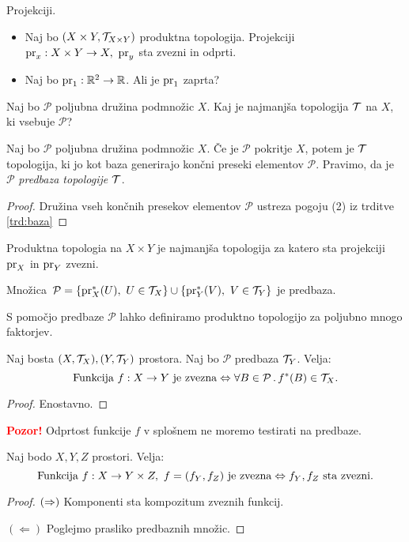 \begin{zgled} 
    Projekciji.
    \begin{itemize}
        \item Naj bo $(X \times Y, \mathcal{T}_{X \times Y})$ produktna topologija. Projekciji $\operatorname{pr}_x: X \times Y \to X, \ \operatorname{pr}_y$ sta zvezni in odprti.
        \item Naj bo $\operatorname{pr}_1: \mathbb{R}^2 \to \mathbb{R}$. Ali je $\operatorname{pr}_1$ zaprta?
    \end{itemize} 
\end{zgled}

Naj bo $\mathcal{P}$ poljubna družina podmnožic $X$. Kaj je najmanjša topologija $\mathcal{T}$ na $X$, ki vsebuje $\mathcal{P}$?

\begin{trditev}
    Naj bo $\mathcal{P}$ poljubna družina podmnožic $X$. Če je $\mathcal{P}$ pokritje $X$, potem je $\mathcal{T}$ topologija, ki jo kot baza generirajo končni preseki elementov $\mathcal{P}$.
    Pravimo, da je $\mathcal{P}$ \emph{predbaza topologije $\mathcal{T}$}.
\end{trditev}

\begin{proof}
    Družina vseh končnih presekov elementov $\mathcal{P}$ ustreza pogoju (2) iz trditve \ref{trd:baza}
\end{proof}

\begin{primer}
    Produktna topologia na $X \times Y$ je najmanjša topologija za katero sta projekciji $\operatorname{pr}_X$ in $\operatorname{pr}_Y$ zvezni. 
    
    Množica~$\mathcal{P} = \left\{\operatorname{pr}_X^{*}(U), \ U \in \mathcal{T}_X\right\} \cup \left\{\operatorname{pr}_Y^{*}(V), \ V \in \mathcal{T}_Y\right\}$ je predbaza. 

    S pomočjo predbaze $\mathcal{P}$ lahko definiramo produktno topologijo za poljubno mnogo faktorjev.
\end{primer}

\begin{trditev}
    Naj bosta $(X, \mathcal{T}_X), (Y, \mathcal{T}_Y)$ prostora. Naj bo $\mathcal{P}$ predbaza $\mathcal{T}_Y$. Velja:
    $$\text{Funkcija } f: X \to Y \text{ je zvezna} \Leftrightarrow \forall B \in \mathcal{P} \,.\, f^{*}(B) \in \mathcal{T}_X.$$
\end{trditev}

\begin{proof}
    Enostavno.
\end{proof}

\textbf{\textcolor{red}{Pozor!}} Odprtost funkcije $f$ v splošnem ne moremo testirati na predbaze.

\begin{trditev}
    Naj bodo $X, Y, Z$ prostori. Velja:
    $$\text{Funkcija } f:X \to Y \times Z, \ f = (f_Y, f_Z) \text{ je zvezna} \Leftrightarrow f_Y, f_Z \text{ sta zvezni}.$$
\end{trditev}

\begin{proof}
    $(\Rightarrow)$ Komponenti sta kompozitum zveznih funkcij.

    $(\Leftarrow)$ Poglejmo prasliko predbaznih množic.
\end{proof}